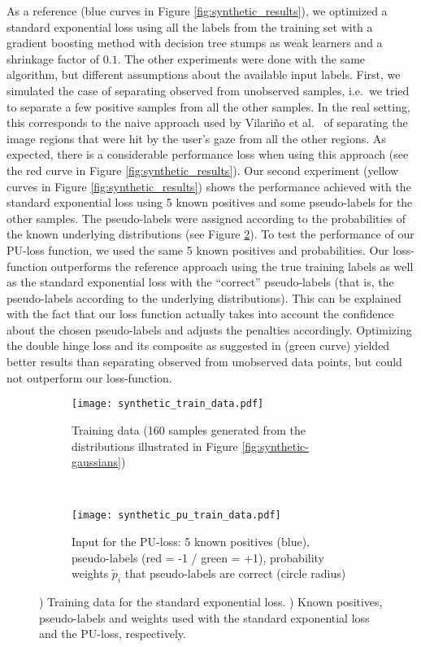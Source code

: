 As a reference (blue curves in Figure \ref{fig:synthetic_results}), we optimized a standard exponential loss using all the labels from the training set with a gradient boosting method with decision tree stumps as weak learners and a shrinkage factor of $0.1.$ 
The other experiments were done with the same algorithm, but different assumptions about the available input labels. 
First, we simulated the case of separating observed from unobserved samples, i.e.\ we tried to separate a few positive samples from all the other samples. 
In the real setting, this corresponds to the naive approach used by Vilari\~no et al.\ \cite{vilarino2007automatic} of separating the image regions that were hit by the user's gaze from all the other regions. 
As expected, there is a considerable performance loss when using this approach (see the red curve in Figure \ref{fig:synthetic_results}). 
Our second experiment (yellow curves in Figure \ref{fig:synthetic_results}) shows the performance achieved with the standard exponential loss using 5 known positives and some pseudo-labels for the other samples. 
The pseudo-labels were assigned according to the probabilities of the known underlying distributions (see Figure \ref{subfig:pu_train}). 
To test the performance of our PU-loss function, we used the same 5 known positives and probabilities. 
Our loss-function outperforms the reference approach using the true training labels as well as the standard exponential loss with the ``correct'' pseudo-labels (that is, the pseudo-labels according to the underlying distributions). 
This can be explained with the fact that our loss function actually takes into account the confidence about the chosen pseudo-labels and adjusts the penalties accordingly. 
Optimizing the double hinge loss and its composite as suggested in \cite{plessis2015convex} (green curve) yielded better results than separating observed from unobserved data points, but could not outperform our loss-function. 

\begin{figure}[ht]
	\centering
	\begin{subfigure}[h]{0.49\textwidth}
	\texttt{[image: synthetic\_train\_data.pdf]}	
		\caption{Training data (160 samples generated from the distributions illustrated in Figure \ref{fig:synthetic-gaussians})\newline}
		\label{subfig:ref_train}
	\end{subfigure}
	~
	\begin{subfigure}[h]{0.49\textwidth}
	\texttt{[image: synthetic\_pu\_train\_data.pdf]}	
		\caption{Input for the PU-loss: 5 known positives (blue), pseudo-labels (red = -1 / green = +1), probability weights $\tilde p_i$ that pseudo-labels are correct (circle radius)}
		\label{subfig:pu_train}
	\end{subfigure}
	\caption{) Training data for the standard exponential loss. ) Known positives, pseudo-labels and weights used with the standard exponential loss and the PU-loss, respectively.}
	\label{fig:synthetic_train_data}
\end{figure}

